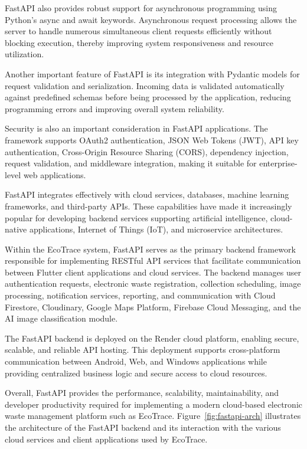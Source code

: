 FastAPI also provides robust support for asynchronous programming using
Python's async and await keywords. Asynchronous request processing allows the
server to handle numerous simultaneous client requests efficiently without
blocking execution, thereby improving system responsiveness and resource
utilization.

Another important feature of FastAPI is its integration with Pydantic models for
request validation and serialization. Incoming data is validated automatically
against predefined schemas before being processed by the application, reducing
programming errors and improving overall system reliability.

Security is also an important consideration in FastAPI applications. The
framework supports OAuth2 authentication, JSON Web Tokens (JWT), API key
authentication, Cross-Origin Resource Sharing (CORS), dependency injection,
request validation, and middleware integration, making it suitable for
enterprise-level web applications.

FastAPI integrates effectively with cloud services, databases, machine learning
frameworks, and third-party APIs. These capabilities have made it increasingly
popular for developing backend services supporting artificial intelligence,
cloud-native applications, Internet of Things (IoT), and microservice architectures.

Within the EcoTrace system, FastAPI serves as the primary backend framework
responsible for implementing RESTful API services that facilitate communication
between Flutter client applications and cloud services. The backend manages user
authentication requests, electronic waste registration, collection scheduling, image
processing, notification services, reporting, and communication with Cloud
Firestore, Cloudinary, Google Maps Platform, Firebase Cloud Messaging, and the AI
image classification module.

The FastAPI backend is deployed on the Render cloud platform, enabling
secure, scalable, and reliable API hosting. This deployment supports cross-platform
communication between Android, Web, and Windows applications while providing
centralized business logic and secure access to cloud resources.

Overall, FastAPI provides the performance, scalability, maintainability, and
developer productivity required for implementing a modern cloud-based
electronic waste management platform such as EcoTrace. Figure~\ref{fig:fastapi-arch}
illustrates the architecture of the FastAPI backend and its interaction with the
various cloud services and client applications used by EcoTrace.

